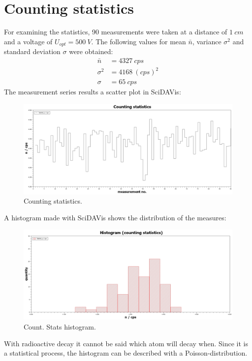 \section{Counting statistics}
%
For examining the statistics, 90 measurements were taken at a distance of \( \SI{1}{cm} \) and a voltage of
\( U_{opt}=\SI{500}{V} \). The following values for mean \( \bar{n} \), variance \( \sigma^{2} \) and standard deviation
\( \sigma \) were obtained:
%
\begin{align}
    \bar{n}     &=  \SI{4327}{cps} \\
    \sigma^{2}  &=  \SI{4168}{(cps)^{2}} \\
    \sigma      &=  \SI{65}{cps}
\end{align}
The measurement series results a scatter plot in SciDAVis:
\begin{figure}[h]
    \centering
    \includegraphics[width=.8\textwidth]{scidavis/Fig.8_Counting statistics.jpg}
    \caption[Counting statistics]{Counting statistics.}
    \label{fig:countingStatistics}
\end{figure}
A histogram made with SciDAVis shows the distribution of the measures:
\begin{figure}[h]
    \centering
    \includegraphics[width=.8\textwidth]{scidavis/Fig.9_Histogram (counting statistics).jpg}
    \caption[Count. stats histogram]{Count. Stats histogram.}
    \label{fig:countStatsHistogram}
\end{figure}
With radioactive decay it cannot be said which atom will decay when. Since it is a statistical process, the histogram
can be described with a Poisson-distribution.
%
